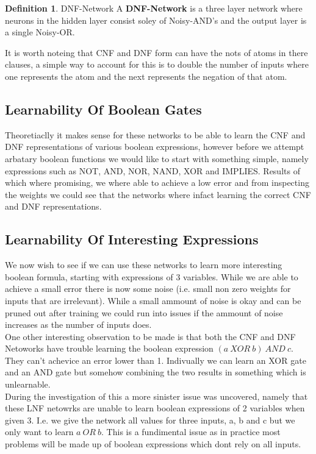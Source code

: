 \documentclass{article}
\theoremstyle{definition}
\newtheorem{definition}{Definition}[section]
\begin{document}
\theoremstyle{definition}
\begin{definition}{DNF-Network}
A \textbf{DNF-Network} is a three layer network where neurons in the hidden layer consist soley of Noisy-AND's and the output layer is a single Noisy-OR. 
\end{definition}

It is worth noteing that CNF and DNF form can have the nots of atoms in there clauses, a simple way to account for this is to double the number of inputs where one represents the atom and the next represents the negation of that atom.

\subsection{Learnability Of Boolean Gates}
Theoretiaclly it makes sense for these networks to be able to learn the CNF and DNF representations of various boolean expressions, however before we attempt arbatary boolean functions we would like to start with something simple, namely expressions such as NOT, AND, NOR, NAND, XOR and IMPLIES. Results of which where promising, we where able to achieve a low error and from inspecting the weights we could see that the networks where infact learning the correct CNF and DNF representations.\\

\subsection{Learnability Of Interesting Expressions}
We now wish to see if we can use these networks to learn more interesting boolean formula, starting with expressions of 3 variables. While we are able to achieve a small error there is now some noise (i.e. small non zero weights for inputs that are irrelevant). While a small ammount of noise is okay and can be pruned out after training we could run into issues if the ammount of noise increases as the number of inputs does. \\

One other interesting observation to be made is that both the CNF and DNF Netoworks have trouble learning the boolean expression $(a\ XOR\ b)\ AND\ c$. They can't achevice an error lower than 1. Indivually we can learn an XOR gate and an AND gate but somehow combining the two results in something which is unlearnable.\\

During the investigation of this a more sinister issue was uncovered, namely that these LNF netowrks are unable to learn boolean expressions of 2 variables when given 3. I.e. we give the network all values for three inputs, a, b and c but we only want to learn $a\ OR\ b$. This is a fundimental issue as in practice most problems will be made up of boolean expressions which dont rely on all inputs. \\
\end{document}
